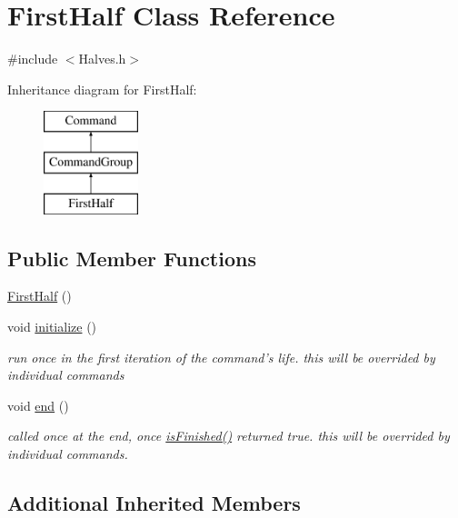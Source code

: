 \hypertarget{classFirstHalf}{\section{First\-Half Class Reference}
\label{classFirstHalf}
}


{\ttfamily \#include $<$Halves.\-h$>$}

Inheritance diagram for First\-Half\-:\begin{figure}[H]
\begin{center}
\leavevmode
\includegraphics[height=3.000000cm]{classFirstHalf}
\end{center}
\end{figure}
\subsection*{Public Member Functions}
\begin{DoxyCompactItemize}
\item 
\hyperlink{classFirstHalf_a9b1433dcaf9e1ceabbd5e02f77a7b75d}{First\-Half} ()
\item 
void \hyperlink{classFirstHalf_ac4f77825ae21e644d2cbc71bfeb92aab}{initialize} ()
\begin{DoxyCompactList}\small\item\em run once in the first iteration of the command's life. this will be overrided by individual commands \end{DoxyCompactList}\item 
void \hyperlink{classFirstHalf_a62ea70262aea29375e5ce5d57bae6638}{end} ()
\begin{DoxyCompactList}\small\item\em called once at the end, once \hyperlink{classCommandGroup_a96807a2763adf9e21ebf2cb9e3574e3c}{is\-Finished()} returned true. this will be overrided by individual commands. \end{DoxyCompactList}\end{DoxyCompactItemize}
\subsection*{Additional Inherited Members}


